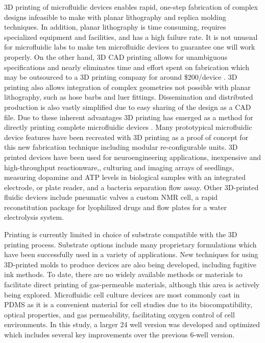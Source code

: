 \documentclass[10pt,letterpaper]{article}
\begin{document}
3D printing of microfluidic devices enables rapid, one-step fabrication of complex designs infeasible to make with planar lithography and replica molding techniques\cite{Waldbaur2011,Chen2014a}.
In addition, planar lithography is time consuming, requires specialized equipment and facilities, and has a high failure rate.
It is not unusual for microfluidic labs to make ten microfluidic devices to guarantee one will work properly.
On the other hand, 3D CAD printing allows for unambiguous specifications and nearly eliminates time and effort spent on fabrication which may be outsourced to a 3D printing company for around \$200/device \cite{Au2014}.
3D printing also allows integration of complex geometries not possible with planar lithography, such as hose barbs and luer fittings.
Dissemination and distributed production is also vastly simplified due to easy sharing of the design as a CAD file.
Due to these inherent advantages 3D printing has emerged as a method for directly printing complete microfluidic devices \cite{Au2014,Comina2014, Chen2014,Shallan2014,Bhargava2014}. 
Many prototypical microfluidic device features have been recreated with 3D printing as a proof of concept for this new fabrication technique \cite{ Au2014, Shallan2014} including modular re-configurable units\cite{Yuen2008,Bhargava2014,Lee2014}.
3D printed devices have been used for neuroengineering applications\cite{Tek2008}, inexpensive and high-throughput reactionware,\cite{Kitson2012,Symes2012,Kitson2013,Kitson2014}, culturing and imaging arrays of seedlings\cite{Busch2012}, measuring dopamine and ATP levels in biological samples with an integrated electrode\cite{Erkal2014}, or plate reader\cite{Chen2014}, and a bacteria separation flow assay\cite{Lee2014a,Lee2015}. 
Other 3D-printed fluidic devices include pneumatic valves\cite{Au2015} a custom NMR cell\cite{Causier2015}, a rapid reconstitution package for lyophilized drugs\cite{Chi2014} and flow plates for a water electrolysis system\cite{Chisholm2014}.

Printing is currently limited in choice of substrate compatible with the 3D printing process.
Substrate options include many proprietary formulations which have been successfully used in a variety of applications.
New techniques for using 3D-printed molds to produce devices\cite{Mcdonald2002,Gregory2013,King2014,Comina2014a,Kamei2015} are also being developed, including fugitive ink methods\cite{Therriault2003,Miller2012,Bhargava2015}.
To date, there are no widely available methods or materials to facilitate direct printing of gas-permeable materials, although this area is actively being explored\cite{Femmer2014a}.
Microfluidic cell culture devices are most commonly cast in PDMS as it is a convenient material for cell studies due to its biocompatibility, optical properties, and gas permeability, facilitating oxygen control of cell environments\cite{Sia2003,Brennan2014}.
In this study, a larger 24 well version was developed and optimized which includes several key improvements over the previous 6-well version.
\end{document}
